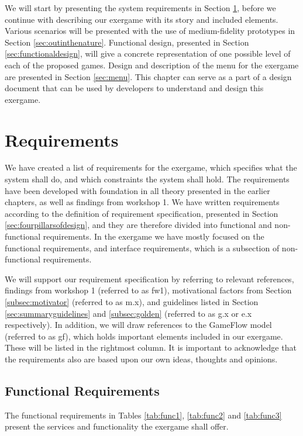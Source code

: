 We will start by presenting the system requirements in Section \ref{sec:req}, before we continue with describing our exergame with its story and included elements. Various scenarios will be presented with the use of medium-fidelity prototypes in Section \ref{sec:outinthenature}. Functional design, presented in Section \ref{sec:functionaldesign}, will give a concrete representation of one possible level of each of the proposed games. Design and description of the menu for the exergame are presented in Section \ref{sec:menu}. This chapter can serve as a part of a design document that can be used by developers to understand and design this exergame.  

\section{Requirements}
\label{sec:req}
We have created a list of requirements for the exergame, which specifies what the system shall do, and which constraints the system shall hold. The requirements have been developed with foundation in all theory presented in the earlier chapters, as well as findings from workshop 1. We have written requirements according to the definition of requirement specification, presented in Section \ref{sec:fourpillarsofdesign}, and they are therefore divided into functional and non-functional requirements. In the exergame we have mostly focused on the functional requirements, and interface requirements, which is a subsection of non-functional requirements. 

We will support our requirement specification by referring to relevant references, findings from workshop 1 (referred to as fw1), motivational factors from Section \ref{subsec:motivator} (referred to as m.x), and guidelines listed in Section \ref{sec:summaryguidelines} and \ref{subsec:golden} (referred to as g.x or e.x respectively). In addition, we will draw references to the GameFlow model \cite{sweetser} (referred to as gf), which holds important elements included in our exergame. These will be listed in the rightmost column. It is important to acknowledge that the requirements also are based upon our own ideas, thoughts and opinions. 

\subsection{Functional Requirements}
The functional requirements in Tables \ref{tab:func1}, \ref{tab:func2} and \ref{tab:func3} present the services and functionality the exergame shall offer.

